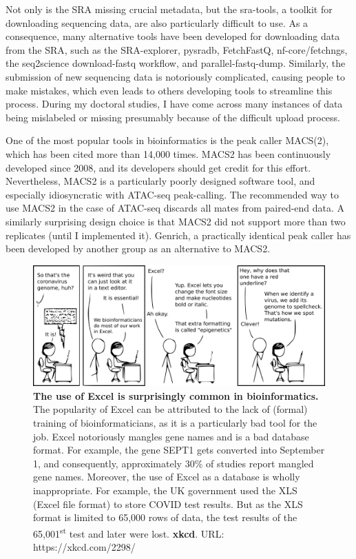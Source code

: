 Not only is the SRA missing crucial metadata, but the sra-tools, a toolkit for downloading sequencing data, are also particularly difficult to use. As a consequence, many alternative tools have been developed for downloading data from the SRA, such as the SRA-explorer\cite{sraexplorer}, pysradb\cite{pysradb}, FetchFastQ\cite{galvez2022metadata}, nf-core/fetchngs\cite{fetchngs}, the seq2science download-fastq workflow\cite{seq2science}, and parallel-fastq-dump\cite{parallelfastq}. Similarly, the submission of new sequencing data is notoriously complicated, causing people to make mistakes, which even leads to others developing tools to streamline this process\cite{Quiones2020}. During my doctoral studies, I have come across many instances of data being mislabeled or missing presumably because of the difficult upload process.

One of the most popular tools in bioinformatics is the peak caller MACS(2), which has been cited more than 14,000 times\cite{Zhang2008}. MACS2 has been continuously developed since 2008, and its developers should get credit for this effort. Nevertheless, MACS2 is a particularly poorly designed software tool, and especially idiosyncratic with ATAC-seq peak-calling. The recommended way to use MACS2 in the case of ATAC-seq discards all mates from paired-end data. A similarly surprising design choice is that MACS2 did not support more than two replicates (until I implemented it). Genrich, a practically identical peak caller has been developed by another group as an alternative to MACS2\cite{Gaspar2018}.

\begin{figure}[H]
    \includegraphics[width=\linewidth]{ch.discussion/imgs/xkcd_excel.png}
    \caption{\textbf{The use of Excel is surprisingly common in bioinformatics.} The popularity of Excel can be attributed to the lack of (formal) training of bioinformaticians, as it is a particularly bad tool for the job. Excel notoriously mangles gene names\cite{Zeeberg2004} and is a bad database format. For example, the gene SEPT1 gets converted into September 1, and consequently, approximately $30\%$ of studies report mangled gene names\cite{Abeysooriya2021}. Moreover, the use of Excel as a database is wholly inappropriate. For example, the UK government used the XLS (Excel file format) to store COVID test results. But as the XLS format is limited to 65,000 rows of data, the test results of the 65,001\textsuperscript{st} test and later were lost\cite{bbc_excel}.
    \textbf{xkcd}. URL: https://xkcd.com/2298/}
    \label{fig:xkcd_excel}
\end{figure}

